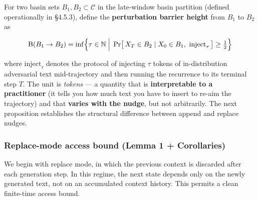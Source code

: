 \documentclass{article}
\theoremstyle{plain}
\theoremstyle{definition}
\begin{document}
For two basin sets $B_1, B_2 \subset \mathcal{C}$ in the late-window
basin partition (defined operationally in §4.5.3), define the
\textbf{perturbation barrier height} from $B_1$ to $B_2$ as

\begin{equation*}
\mathrm{B}(B_1 \to B_2)
=\inf\Bigl\{ \tau \in \mathbb{N} \;\Big|\;
\Pr\bigl[\,X_T \in B_2 \mid X_0 \in B_1,\ \text{inject}_\tau\,\bigr] \geq \tfrac{1}{2}\Bigr\}
\end{equation*}

where $\text{inject}_\tau$ denotes the protocol of injecting $\tau$
tokens of in-distribution adversarial text mid-trajectory and then
running the recurrence to its terminal step $T$. The unit is \textit{tokens}
— a quantity that is \textbf{interpretable to a practitioner} (it tells you
how much text you have to insert to re-aim the trajectory) and that
\textbf{varies with the nudge}, but not arbitrarily. The next proposition
establishes the structural difference between append and replace nudges.

\subsubsection{Replace-mode access bound (Lemma 1 + Corollaries)}

We begin with replace mode, in which the previous context is discarded
after each generation step. In this regime, the next state depends
only on the newly generated text, not on an accumulated context
history. This permits a clean finite-time access bound.
\end{document}
